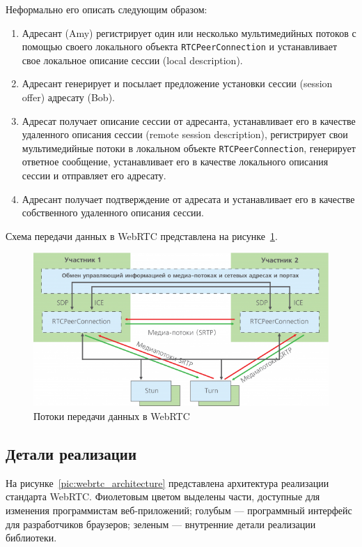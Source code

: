 Неформально его описать следующим образом:
\begin{enumerate}
\item Адресант (Amy) регистрирует один или несколько мультимедийных потоков
  с помощью своего локального объекта \texttt{RTCPeerConnection} и устанавливает
  свое локальное описание сессии (local description).
\item Адресант генерирует и посылает предложение установки сессии (session offer)
  адресату (Bob).
\item Адресат получает описание сессии от адресанта,
  устанавливает его в качестве удаленного описания сессии
  (remote session description), регистрирует свои мультимедийные потоки
  в локальном объекте \texttt{RTCPeerConnection}, генерирует ответное сообщение,
  устанавливает его в качестве локального описания сессии и отправляет его адресату.
\item Адресант получает подтверждение от адресата и устанавливает его в качестве 
  собственного удаленного описания сессии.
\end{enumerate}

Схема передачи данных в WebRTC представлена на рисунке~\ref{pic:webrtc_transmission}.

\begin{figure}[h!]
  \centering
  \includegraphics[width=130mm]{pic/webrtc_transmission.png}
  \caption{Потоки передачи данных в WebRTC}
  \label{pic:webrtc_transmission}
\end{figure}

\subsection{Детали реализации}
\label{ssec:webrtc_realization}

На рисунке~\ref{pic:webrtc_architecture} представлена архитектура реализации
стандарта WebRTC. Фиолетовым цветом выделены части, доступные для изменения 
программистам веб-приложений; голубым --- программный интерфейс для разработчиков 
браузеров; зеленым --- внутренние детали реализации библиотеки.

